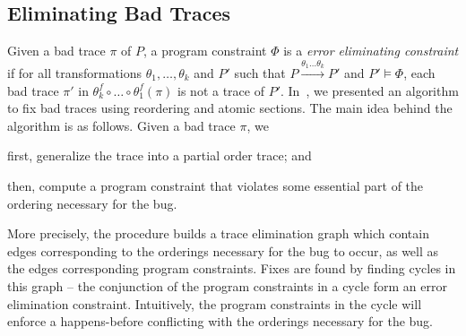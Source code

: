 \documentclass{llncs}
\newcommand\Prog{\ensuremath{\mathit{P}}}
\newcommand\ProgCons{\ensuremath{\Phi}}
\newcommand\trace{\pi}
\newcommand\reorder{\theta}
\begin{document}
\subsection{Eliminating Bad Traces}
\label{sec:fix_bad}



Given a bad trace $\trace$ of $\Prog$, a program constraint $\ProgCons$
is a {\em error eliminating constraint} if for all transformations
$\reorder_1,\ldots,\reorder_k$ and $\Prog'$ such that 
$\Prog\xrightarrow{\reorder_1\ldots\reorder_k}\Prog'$ and $\Prog'
\models \ProgCons$, each bad trace
$\trace'$ in $\reorder_k^f\circ\ldots\circ\reorder_1^f(\trace)$ is not a
trace of $\Prog'$.
In~\cite{cav2013}, we presented an algorithm to fix bad traces using
reordering and atomic sections.
The main idea behind the algorithm is as follows.
Given a bad trace $\trace$, we 
\begin{inparaenum}[(a)]
\item first, generalize the trace into a partial order trace; and
\item then, compute a program constraint that violates some essential
  part of the ordering necessary for the bug. 
\end{inparaenum}

More precisely, the procedure builds a trace elimination graph which
contain edges corresponding to the orderings necessary for the
bug to occur, as well as the edges corresponding program constraints.
Fixes are found by finding cycles in this graph -- the conjunction of
the program constraints in a cycle form an error elimination constraint.
Intuitively, the program constraints in the cycle will enforce a
happens-before conflicting with the orderings necessary for the bug.
\end{document}

